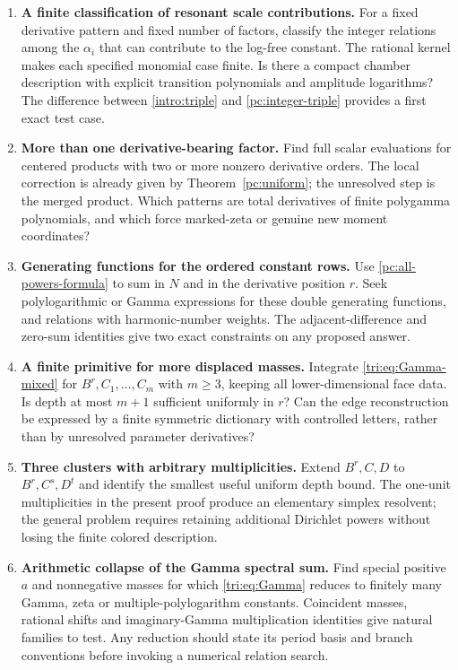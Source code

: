 \begin{enumerate}[label=\textbf{Q\arabic*.},leftmargin=*]
\item \textbf{A finite classification of resonant scale contributions.}
For a fixed derivative pattern and fixed number of factors, classify
the integer relations among the $\alpha_i$ that can contribute to
the log-free constant. The rational kernel makes each specified
monomial case finite. Is there a compact chamber description with
explicit transition polynomials and amplitude logarithms?
The difference between \eqref{intro:triple} and
\eqref{pc:integer-triple} provides a first exact test case.

\item \textbf{More than one derivative-bearing factor.}
Find full scalar evaluations for centered products with two or more
nonzero derivative orders. The local correction is already given by
Theorem~\ref{pc:uniform}; the unresolved step is the merged product.
Which patterns are total derivatives of finite polygamma polynomials,
and which force marked-zeta or genuine new moment coordinates?

\item \textbf{Generating functions for the ordered constant rows.}
Use \eqref{pc:all-powers-formula} to sum in $N$ and in the derivative
position $r$. Seek polylogarithmic or Gamma expressions for these
double generating functions, and relations with harmonic-number
weights. The adjacent-difference and zero-sum identities give two
exact constraints on any proposed answer.

\item \textbf{A finite primitive for more displaced masses.}
Integrate \eqref{tri:eq:Gamma-mixed} for
$B^r,C_1,\ldots,C_m$ with $m\ge3$, keeping all lower-dimensional
face data. Is depth at most $m+1$ sufficient uniformly in $r$?
Can the edge reconstruction be expressed by a finite symmetric
dictionary with controlled letters, rather than by unresolved
parameter derivatives?

\item \textbf{Three clusters with arbitrary multiplicities.}
Extend $B^r,C,D$ to $B^r,C^s,D^t$ and identify the smallest useful
uniform depth bound. The one-unit multiplicities in the present
proof produce an elementary simplex resolvent; the general problem
requires retaining additional Dirichlet powers without losing the
finite colored description.

\item \textbf{Arithmetic collapse of the Gamma spectral sum.}
Find special positive $a$ and nonnegative masses for which
\eqref{tri:eq:Gamma} reduces to finitely many Gamma, zeta or
multiple-polylogarithm constants. Coincident masses, rational
shifts and imaginary-Gamma multiplication identities give natural
families to test. Any reduction should state its period basis and
branch conventions before invoking a numerical relation search.


\end{enumerate}
